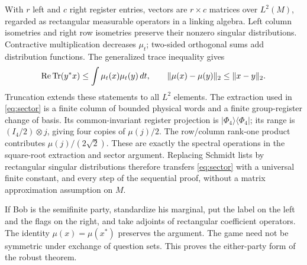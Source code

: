 With $r$ left and $c$ right register entries, vectors are $r\times c$ matrices over $L^2(M)$, regarded as rectangular measurable operators in a linking algebra. Left column isometries and right row isometries preserve their nonzero singular distributions. Contractive multiplication decreases $\mu_t$; two-sided orthogonal sums add distribution functions. The generalized trace inequality \cite[Lemma 2.5 and Theorem 4.2]{FK} gives
\[
 \operatorname{Re}\operatorname{Tr}(y^*x)\le\int\mu_t(x)\mu_t(y)\,dt,
 \qquad \|\mu(x)-\mu(y)\|_2\le\|x-y\|_2.
\]
Truncation extends these statements to all $L^2$ elements. The extraction used in \eqref{eq:sector} is a finite column of bounded physical words and a finite group-register change of basis. Its common-invariant register projection is $|\Phi_4\rangle\langle\Phi_4|$; its range is $(I_4/2)\otimes j$, giving four copies of $\mu(j)/2$. The row/column rank-one product contributes $\mu(j)/(2\sqrt2)$. These are exactly the spectral operations in the square-root extraction and sector argument. Replacing Schmidt lists by rectangular singular distributions therefore transfers \eqref{eq:sector} with a universal finite constant, and every step of the sequential proof, without a matrix approximation assumption on $M$.

If Bob is the semifinite party, standardize his marginal, put the label on the left and the flags on the right, and take adjoints of rectangular coefficient operators. The identity $\mu(x)=\mu(x^*)$ preserves the argument. The game need not be symmetric under exchange of question sets. This proves the either-party form of the robust theorem.

